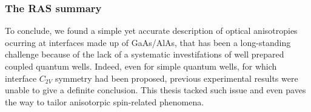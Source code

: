 \subsubsection{The RAS summary}
\label{subsubsec:chapter-3-ras-conclusions}
\vspace{-10mm}
To conclude, we found a simple yet accurate description of optical anisotropies ocurring at interfaces made up of GaAs/AlAs, that has been a long-standing challenge  because of the lack of a systematic investifations of well prepared coupled 
quantum wells. Indeed, even for simple quantum wells, for which interface $C_{2V}$ symmetry had been proposed, previous experimental results were unable to  give a definite conclusion. This thesis tacked such issue and even paves the way to tailor
anisotorpic spin-related phenomena.









